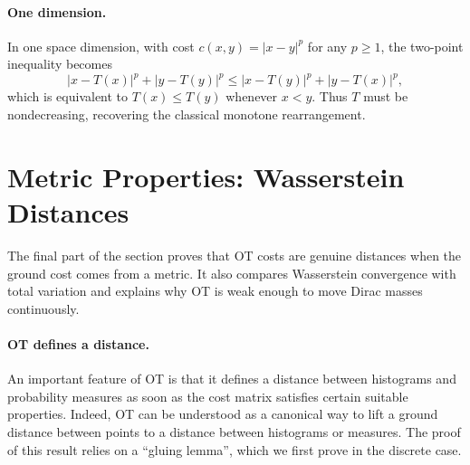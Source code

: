 \paragraph{One dimension.}

In one space dimension, with cost $c(x,y)=|x-y|^p$ for any $p\geq1$, the two-point inequality becomes
\[
	|x-T(x)|^p+|y-T(y)|^p
	\leq
	|x-T(y)|^p+|y-T(x)|^p,
\]
which is equivalent to $T(x)\leq T(y)$ whenever $x<y$. Thus $T$ must be nondecreasing, recovering the classical monotone rearrangement.

\section{Metric Properties: Wasserstein Distances}


The final part of the section proves that OT costs are genuine distances when the ground cost comes from a metric. It also compares Wasserstein convergence with total variation and explains why OT is weak enough to move Dirac masses continuously.

\paragraph{OT defines a distance.}


An important feature of OT is that it defines a distance between histograms and probability measures as soon as the cost matrix satisfies certain suitable properties. Indeed, OT can be understood as a canonical way to lift a ground distance between points to a distance between histograms or measures.
%
The proof of this result relies on a ``gluing lemma'', which we first prove in the discrete case.

